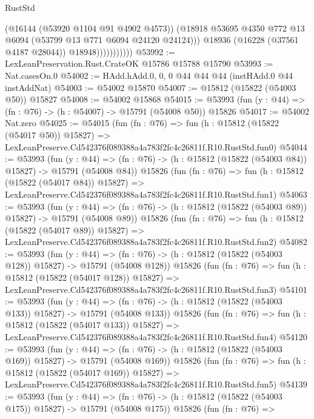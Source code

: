 \begin{lexlean}{RustStd}
\begin{coremodule}
                            (@16144 (@53920 @1104 @91 @4902 @4573))
                            (@18918
                              @53695
                              @4350
                              @772
                              @13
                              @6094
                              (@53799 @13 @771 @6094 @24120 @24124)))
                          @18936
                          (@16228 (@37561 @4187 @28044))
                          @18948)))))))))))
@53992 := LexLeanPreservation.Rust.CrateOK @15786 @15788 @15790
@53993 := Nat.casesOn.{0}
@54002 := HAdd.hAdd.{0, 0, 0} @44 @44 @44 (instHAdd.{0} @44 instAddNat)
@54003 := @54002 @15870
@54007 := @15812 (@15822 (@54003 @50)) @15827
@54008 := @54002 @15868
@54015 := @53993 (fun (y : @44) => (fn : @76) -> (h : @54007) -> @15791 (@54008 @50)) @15826
@54017 := @54002 Nat.zero
@54025 := @54015
    (fun (fn : @76) =>
    fun (h : @15812 (@15822 (@54017 @50)) @15827) =>
    LexLeanPreserve.Cd542376f089388a4a783f2fc4c26811f.R10.RustStd.fun0)
@54044 := @53993
    (fun (y : @44) =>
    (fn : @76) -> (h : @15812 (@15822 (@54003 @84)) @15827) -> @15791 (@54008 @84))
    @15826
    (fun (fn : @76) =>
    fun (h : @15812 (@15822 (@54017 @84)) @15827) =>
    LexLeanPreserve.Cd542376f089388a4a783f2fc4c26811f.R10.RustStd.fun1)
@54063 := @53993
    (fun (y : @44) =>
    (fn : @76) -> (h : @15812 (@15822 (@54003 @89)) @15827) -> @15791 (@54008 @89))
    @15826
    (fun (fn : @76) =>
    fun (h : @15812 (@15822 (@54017 @89)) @15827) =>
    LexLeanPreserve.Cd542376f089388a4a783f2fc4c26811f.R10.RustStd.fun2)
@54082 := @53993
    (fun (y : @44) =>
    (fn : @76) -> (h : @15812 (@15822 (@54003 @128)) @15827) -> @15791 (@54008 @128))
    @15826
    (fun (fn : @76) =>
    fun (h : @15812 (@15822 (@54017 @128)) @15827) =>
    LexLeanPreserve.Cd542376f089388a4a783f2fc4c26811f.R10.RustStd.fun3)
@54101 := @53993
    (fun (y : @44) =>
    (fn : @76) -> (h : @15812 (@15822 (@54003 @133)) @15827) -> @15791 (@54008 @133))
    @15826
    (fun (fn : @76) =>
    fun (h : @15812 (@15822 (@54017 @133)) @15827) =>
    LexLeanPreserve.Cd542376f089388a4a783f2fc4c26811f.R10.RustStd.fun4)
@54120 := @53993
    (fun (y : @44) =>
    (fn : @76) -> (h : @15812 (@15822 (@54003 @169)) @15827) -> @15791 (@54008 @169))
    @15826
    (fun (fn : @76) =>
    fun (h : @15812 (@15822 (@54017 @169)) @15827) =>
    LexLeanPreserve.Cd542376f089388a4a783f2fc4c26811f.R10.RustStd.fun5)
@54139 := @53993
    (fun (y : @44) =>
    (fn : @76) -> (h : @15812 (@15822 (@54003 @175)) @15827) -> @15791 (@54008 @175))
    @15826
    (fun (fn : @76) =>

\end{coremodule}
\end{lexlean}
